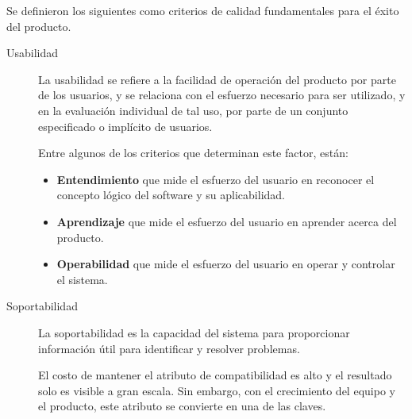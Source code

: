 Se definieron los siguientes como criterios de calidad fundamentales para el
éxito del producto\cite{Fillottrani}.

\begin{description}
\item [Usabilidad] La usabilidad se refiere a la facilidad de operación del
    producto por parte de los usuarios, y se relaciona con el esfuerzo
    necesario para ser utilizado, y en la evaluación individual de tal uso, por
    parte de un conjunto especificado o implícito de usuarios.

    Entre algunos de los criterios que determinan este factor, están:

    \begin{itemize}
    \item \textbf{Entendimiento} que mide el esfuerzo del usuario en reconocer el
        concepto lógico del software y su aplicabilidad.
    \item \textbf{Aprendizaje} que mide el esfuerzo del usuario en aprender
        acerca del producto.
    \item \textbf{Operabilidad} que mide el esfuerzo del usuario en operar y
        controlar el sistema.
    \end{itemize}

%

\item [Soportabilidad] La soportabilidad es la capacidad del sistema para
    proporcionar información útil para identificar y resolver problemas.

    El costo de mantener el atributo de compatibilidad es alto y el resultado
    solo es visible a gran escala. Sin embargo, con el crecimiento del equipo y
    el producto, este atributo se convierte en una de las claves\cite{Ashanin}.


\end{description}

